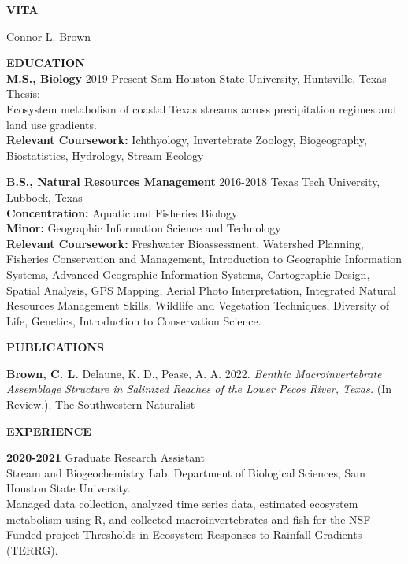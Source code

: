 %
\clearpage
{}
\setlength{\parindent}{0pt}
\begin{singlespace}
\begin{center}{\textbf{VITA}}\end{center}
\par
\par
\begin{center}Connor L. Brown\end{center}

\textbf{EDUCATION}\\
\smallskip\textbf{M.S., Biology} 2019-Present
Sam Houston State University, Huntsville, Texas
Thesis:\\Ecosystem  metabolism  of  coastal  Texas  streams  across  precipitation regimes and land use gradients.\\
\textbf{Relevant Coursework:} Ichthyology, Invertebrate Zoology, Biogeography, Biostatistics, Hydrology, Stream Ecology

\medskip\textbf{B.S., Natural Resources Management} 2016-2018
Texas Tech University, Lubbock, Texas\\
\textbf{Concentration:} Aquatic and Fisheries Biology\\
\textbf{Minor:} Geographic Information Science and Technology\\
\textbf{Relevant Coursework:} Freshwater Bioassessment, Watershed Planning, Fisheries Conservation and Management, Introduction to Geographic Information Systems, Advanced Geographic Information Systems, Cartographic Design, Spatial Analysis, GPS Mapping, Aerial Photo Interpretation, Integrated Natural Resources Management Skills, Wildlife and Vegetation Techniques, Diversity of Life, Genetics, Introduction to Conservation Science.

\bigskip\textbf{PUBLICATIONS}

\smallskip\textbf{Brown, C. L.} Delaune, K. D., Pease, A. A. 2022. \textit{Benthic Macroinvertebrate Assemblage Structure in Salinized Reaches of the Lower Pecos River, Texas.} (In Review.). The Southwestern Naturalist
\bigskip

\textbf{EXPERIENCE}

\smallskip\textbf{2020-2021} Graduate Research Assistant\\Stream and Biogeochemistry Lab, Department of Biological Sciences, Sam Houston State University.\\Managed data collection, analyzed time series data, estimated ecosystem metabolism using R, and collected macroinvertebrates and fish for the NSF Funded project Thresholds in Ecosystem Responses to Rainfall Gradients (TERRG).


\end{singlespace}
